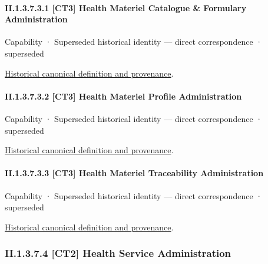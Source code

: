 \paragraph*{II.1.3.7.3.1 [CT3] Health Materiel Catalogue \& Formulary Administration}
\label{navigation:II.1.3.7.3.1}

\label{element:5c691959e2cc4a289fc25b9f3497eed9}
{\small Capability · Superseded historical identity — direct correspondence · superseded}\par
\href{../../../../continuum/strategy/capability/5c691959e2cc4a289fc25b9f3497eed9.md}{Historical canonical definition and provenance}.\par
\paragraph*{II.1.3.7.3.2 [CT3] Health Materiel Profile Administration}
\label{navigation:II.1.3.7.3.2}

\label{element:9216f9cc905e4526b1d98cd4ab382cbf}
{\small Capability · Superseded historical identity — direct correspondence · superseded}\par
\href{../../../../continuum/strategy/capability/9216f9cc905e4526b1d98cd4ab382cbf.md}{Historical canonical definition and provenance}.\par
\paragraph*{II.1.3.7.3.3 [CT3] Health Materiel Traceability Administration}
\label{navigation:II.1.3.7.3.3}

\label{element:f1b888e8d50c4019ac1afe162d6223f3}
{\small Capability · Superseded historical identity — direct correspondence · superseded}\par
\href{../../../../continuum/strategy/capability/f1b888e8d50c4019ac1afe162d6223f3.md}{Historical canonical definition and provenance}.\par
\subsubsection*{II.1.3.7.4 [CT2] Health Service Administration}
\label{navigation:II.1.3.7.4}

